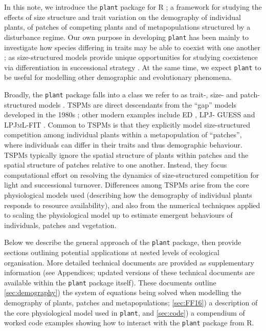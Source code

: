 \documentclass[a4paper,11pt]{article}
\newcommand{\plant}{\texttt{plant}}
\begin{document}
In this note, we introduce the {\plant} package for R \citep{R-2015};
a framework for studying the effects of size structure and
trait variation on the demography of individual plants, of patches of
competing plants and of metapopulations structured by a
disturbance regime.
%
Our own purpose in developing {\plant} has been mainly to investigate how species
differing in traits may be able to coexist with one another
\citep[following ][]{Falster-2011, Falster-2015}; as size-structured models
provide unique opportunities for studying coexistence via differentiation in
successional strategy \citep[see also][]{Huston-1987, Moorcroft-2001, Uriate-2016}.
At the same time, we expect {\plant} to be useful for modelling other demographic and evolutionary phenomena.

Broadly, the {\plant} package falls into a class we refer to as trait-, size- and
patch-structured models \citep[\textsc{TSPMs}, following][]{Falster-2011}. \textsc{TSPMs} are direct
descendants from the ``gap'' models developed in the 1980s
\citep[e.g.,][]{Shugart-1980, Huston-1987, Kohyama-1993}; other modern examples
include \textsc{ED} \citep{Moorcroft-2001}, \textsc{LPJ- GUESS}
\citep{Smith-2014} and \textsc{LPJmL-FIT} \citep{Sakschewski-2015}. Common to
\textsc{TSPMs} is that they explicitly model size-structured competition
among individual plants within a metapopulation of ``patches'', where
individuals can differ in their traits and thus demographic behaviour.
\textsc {TSPMs} typically ignore the spatial structure of plants within
patches and the spatial structure of patches relative to one another. Instead,
they focus computational effort on resolving the dynamics of size-structured
competition for light and successional turnover. Differences among
\textsc{TSPMs} arise from the core physiological models used (describing
how the demography of individual plants responds to resource availability),
and also from the numerical techniques applied to scaling the physiological model
up to estimate emergent behaviours of individuals, patches and vegetation.

Below we describe the general approach of the {\plant} package, then provide
sections outlining potential applications at nested levels of ecological organisation.
More detailed technical documents are provided as supplementary information
(see Appendices; updated versions of these technical documents are
available within the {\plant} package itself). These documents outline \ref{sec:demography}) the system of
equations being solved when modelling the demography of plants, patches and metapopulations; \ref{sec:FF16}) a description of the core
physiological model used in {\plant}, and \ref{sec:code}) a compendium of worked code examples showing how to interact with the {\plant} package from R.
\end{document}
